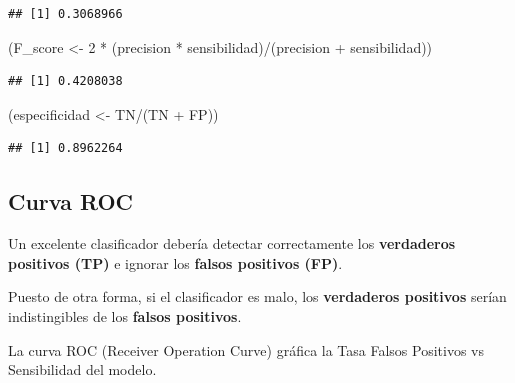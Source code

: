 \documentclass[
  12pt,
]{book}
\newenvironment{Shaded}{\begin{snugshade}}{\end{snugshade}}
\newcommand{\AttributeTok}[1]{\textcolor[rgb]{0.77,0.63,0.00}{#1}}
\newcommand{\DecValTok}[1]{\textcolor[rgb]{0.00,0.00,0.81}{#1}}
\newcommand{\FunctionTok}[1]{\textcolor[rgb]{0.00,0.00,0.00}{#1}}
\newcommand{\NormalTok}[1]{#1}
\newcommand{\OtherTok}[1]{\textcolor[rgb]{0.56,0.35,0.01}{#1}}
\newcommand{\SpecialCharTok}[1]{\textcolor[rgb]{0.00,0.00,0.00}{#1}}
\newcommand{\StringTok}[1]{\textcolor[rgb]{0.31,0.60,0.02}{#1}}
\theoremstyle{definition}
\theoremstyle{definition}
\theoremstyle{definition}
\theoremstyle{remark}
\begin{document}
\begin{verbatim}
## [1] 0.3068966
\end{verbatim}

\begin{Shaded}
\begin{Highlighting}[]
\NormalTok{(F\_score }\OtherTok{\textless{}{-}} \DecValTok{2} \SpecialCharTok{*}\NormalTok{ (precision }\SpecialCharTok{*}\NormalTok{ sensibilidad)}\SpecialCharTok{/}\NormalTok{(precision }\SpecialCharTok{+} 
\NormalTok{    sensibilidad))}
\end{Highlighting}
\end{Shaded}

\begin{verbatim}
## [1] 0.4208038
\end{verbatim}

\begin{Shaded}
\begin{Highlighting}[]
\NormalTok{(especificidad }\OtherTok{\textless{}{-}}\NormalTok{ TN}\SpecialCharTok{/}\NormalTok{(TN }\SpecialCharTok{+}\NormalTok{ FP))}
\end{Highlighting}
\end{Shaded}

\begin{verbatim}
## [1] 0.8962264
\end{verbatim}

\hypertarget{curva-roc}{%
\subsection{Curva ROC}\label{curva-roc}}

Un excelente clasificador debería detectar correctamente los \textbf{verdaderos positivos (TP)} e ignorar los \textbf{falsos positivos (FP)}.

Puesto de otra forma, si el clasificador es malo, los \textbf{verdaderos positivos} serían indistingibles de los \textbf{falsos positivos}.

La curva ROC (Receiver Operation Curve) gráfica la Tasa Falsos Positivos vs Sensibilidad del modelo.

\begin{Shaded}
\end{Shaded}
\end{document}

